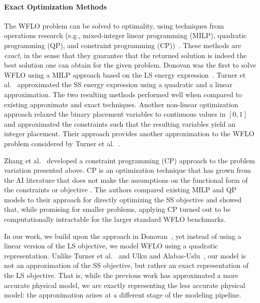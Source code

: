 \documentclass[preprint,12pt]{elsarticle}
\begin{document}
\paragraph{Exact Optimization Methods} 
The WFLO problem can be solved  
to optimality, using
techniques from operations research (e.g., mixed-integer linear programming (MILP), quadratic programming (QP), and constraint programming (CP))~\cite{Zhang2014,turner2014new,donovan2005wind}.
These methods are \emph{exact}, in the sense that they guarantee that the returned solution is indeed
the best solution one can obtain for the given problem. Donovan was the first to solve WFLO using a
MILP approach based on the LS energy expression~\cite{donovan2005wind}. Turner et al.\ \cite{turner2014new} approximated the SS energy expression using a quadratic and a linear approximation. The two resulting methods performed well when
compared to existing approximate and exact techniques.
Another non-linear optimization approach \cite{ulku2019new} relaxed the binary placement variables to continuous values in $[0,1]$
and approximated the constraints such that the resulting variables yield an integer placement.
Their approach provides another approximation to the WFLO problem considered by Turner et al.\ \cite{turner2014new}.

Zhang et al.\ \cite{Zhang2014} developed a constraint programming (CP) approach to the problem variation presented above. CP is an optimization technique that has grown from the AI literature that does not make the assumptions on the functional form of the constraints or objective \cite{rossi2006handbook}. The authors compared existing MILP and QP models to their approach for directly optimizing the SS objective and showed that, while promising for smaller problems, applying CP turned out to be computationally intractable for the larger standard WFLO benchmarks. 


In our work, we build upon the approach in Donovan~\cite{donovan2005wind}, yet instead of using a linear version of the LS objective, we 
model WFLO using a quadratic representation. %
Unlike Turner et al.\ \cite{turner2014new} and Ulku and Alabas-Uslu\ \cite{ulku2019new}, our model is not an approximation of the SS objective, 
but rather an exact representation of the LS objective. That is, while the previous work has approximated a more accurate physical model, we are exactly representing the less accurate physical model: the approximation arises at a different stage of the modeling pipeline.
\end{document}
